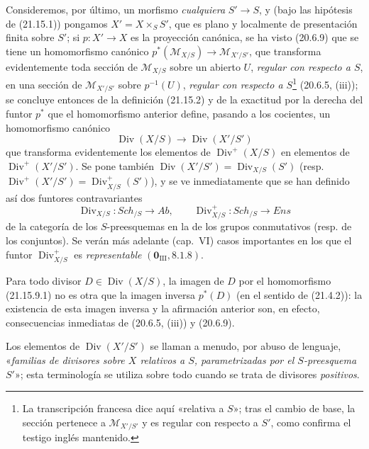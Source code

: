\begin{env}[21.15.9]
\label{IV.21.15.9}
Consideremos, por último, un morfismo \emph{cualquiera} $S'\to S$, y (bajo las hipótesis de
(21.15.1)) pongamos $X'=X\times_S S'$, que es plano y localmente de presentación finita
sobre $S'$; si $p:X'\to X$ es la proyección canónica, se ha visto (20.6.9) que se tiene un
homomorfismo canónico
$p^*(\mathscr M_{X/S})\to\mathscr M_{X'/S'}$, que transforma evidentemente toda
sección de $\mathscr M_{X/S}$ sobre un abierto $U$, \emph{regular con respecto
a $S$}, en una sección de $\mathscr M_{X'/S'}$ sobre $p^{-1}(U)$, \emph{regular con respecto a $S$}\footnote{La transcripción francesa dice aquí «relativa a $S$»; tras el cambio de base, la sección pertenece a $\mathscr M_{X'/S'}$ y es regular con respecto a $S'$, como confirma el testigo inglés mantenido.} (20.6.5, (iii)); se concluye entonces de la
definición (21.15.2) y de la exactitud por la derecha del funtor $p^*$ que
el homomorfismo anterior define, pasando a los cocientes, un homomorfismo canónico
\[
\label{IV.21.15.9.1}
  \operatorname{Div}(X/S)\longrightarrow\operatorname{Div}(X'/S')
  \tag{21.15.9.1}
\]
que transforma evidentemente los elementos de $\operatorname{Div}^+(X/S)$ en elementos de
$\operatorname{Div}^+(X'/S')$. Se pone también
$\operatorname{Div}(X'/S')=\operatorname{Div}_{X/S}(S')$ (resp.
$\operatorname{Div}^+(X'/S')=\operatorname{Div}_{X/S}^+(S')$), y se ve inmediatamente
que se han definido así dos funtores contravariantes
\[
  \operatorname{Div}_{X/S}:\boldsymbol{\mathit{Sch}}_{/S}\longrightarrow\boldsymbol{\mathit{Ab}},\qquad
  \operatorname{Div}_{X/S}^+:\boldsymbol{\mathit{Sch}}_{/S}\longrightarrow\boldsymbol{\mathit{Ens}}
\]
de la categoría de los $S$-preesquemas en la de los grupos conmutativos (resp. de los
conjuntos). Se verán más adelante (cap.~VI) casos importantes en los que el funtor
$\operatorname{Div}_{X/S}^+$ es \emph{representable} $(\mathbf 0_{\mathrm{III}},
8.1.8)$.

Para todo divisor $D\in\operatorname{Div}(X/S)$, la imagen de $D$ por
el homomorfismo (21.15.9.1) no es otra que la imagen inversa
$p^*(D)$ (en el sentido de (21.4.2)): la existencia de esta imagen inversa y la afirmación
anterior son, en efecto, consecuencias inmediatas de (20.6.5, (iii)) y (20.6.9).

Los elementos de $\operatorname{Div}(X'/S')$ se llaman a menudo, por abuso de lenguaje,
«\emph{familias de divisores sobre $X$ relativos a $S$, parametrizadas por el
$S$-preesquema $S'$}»; esta terminología se utiliza sobre todo cuando se trata de
divisores \emph{positivos}.
\end{env}

